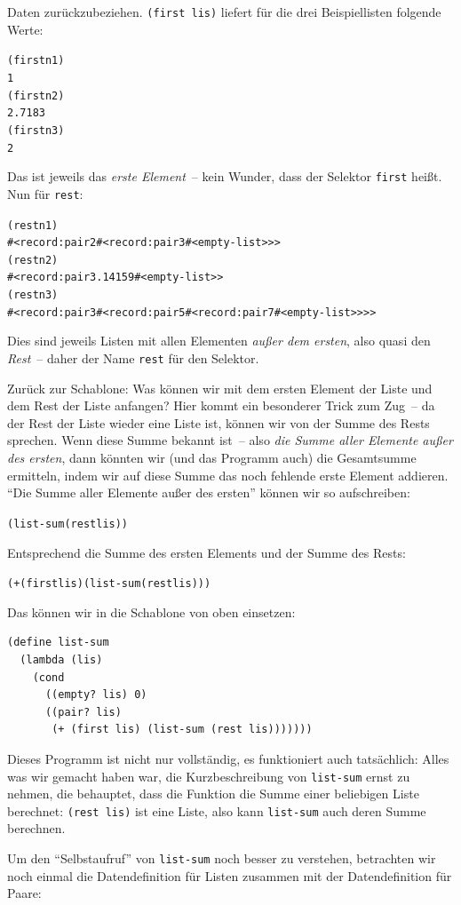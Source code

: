 Daten zurückzubeziehen.  \texttt{(first lis)} liefert für die drei
Beispiellisten folgende Werte:
%
\begin{alltt}
(first n1)
\evalsto{} 1
(first n2)
\evalsto{} 2.7183
(first n3)
\evalsto{} 2
\end{alltt}
%
Das ist jeweils das \emph{erste Element}~-- kein Wunder, dass der
Selektor \texttt{first} heißt.  Nun für \texttt{rest}:
%
\begin{alltt}
(rest n1)
\evalsto{} #<record:pair 2 #<record:pair 3 #<empty-list>>>
(rest n2)
\evalsto{}  #<record:pair 3.14159 #<empty-list>>
(rest n3)
\evalsto{} #<record:pair 3 #<record:pair 5 #<record:pair 7 #<empty-list>>>>
\end{alltt}
%
Dies sind jeweils Listen mit allen Elementen \emph{außer dem
  ersten}, also quasi den \emph{Rest}~-- daher der Name \texttt{rest}
für den Selektor.

Zurück zur Schablone: Was können wir mit dem ersten Element der Liste
und dem Rest der Liste anfangen?  Hier kommt ein besonderer Trick zum
Zug~-- da der Rest der Liste wieder eine Liste ist, können
wir von der Summe des Rests sprechen.  Wenn diese Summe bekannt
ist~-- also \emph{die Summe aller Elemente außer des ersten}, dann
könnten wir (und das Programm auch) die Gesamtsumme ermitteln, indem wir
auf diese Summe das noch fehlende erste Element addieren.  "`Die Summe
aller Elemente außer des ersten"' können wir so aufschreiben:
%
\begin{alltt}
(list-sum (rest lis))
\end{alltt}
%
Entsprechend die Summe des ersten Elements und der Summe des Rests:
%
\begin{alltt}
(+ (first lis) (list-sum (rest lis)))
\end{alltt}
%
Das können wir in die Schablone von oben einsetzen:
%
\begin{verbatim}
(define list-sum
  (lambda (lis)
    (cond
      ((empty? lis) 0)
      ((pair? lis)
       (+ (first lis) (list-sum (rest lis)))))))
\end{verbatim}
%
Dieses Programm ist nicht nur vollständig, es funktioniert auch
tatsächlich: Alles was wir gemacht haben war, die Kurzbeschreibung
von \texttt{list-sum} ernst zu nehmen, die behauptet, dass die Funktion
die Summe einer beliebigen Liste berechnet: \texttt{(rest lis)} ist
eine Liste, also kann \texttt{list-sum} auch deren Summe berechnen.

Um den "`Selbstaufruf"' von \texttt{list-sum} noch besser zu
verstehen, betrachten wir noch einmal die Datendefinition für
Listen zusammen mit der Datendefinition für Paare:

